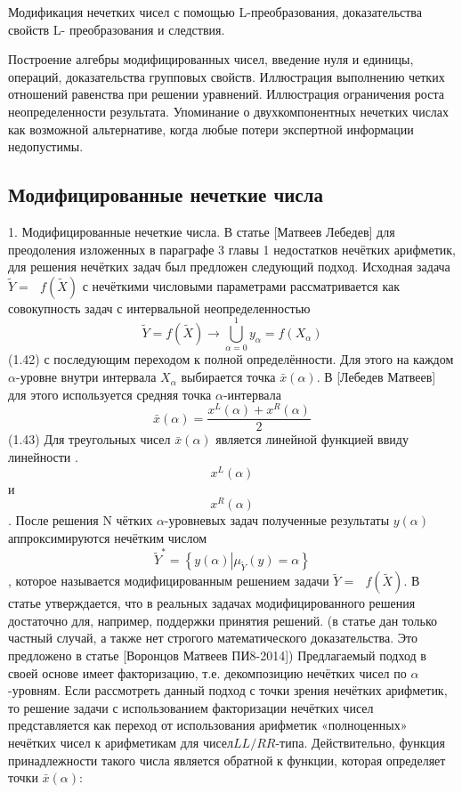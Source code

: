 Модификация нечетких чисел с помощью L-преобразования, доказательства свойств L- преобразования и следствия.

Построение алгебры модифицированных чисел, введение нуля и единицы,  операций, доказательства групповых свойств. Иллюстрация выполнению четких отношений равенства при решении уравнений. Иллюстрация ограничения роста неопределенности результата. Упоминание о двухкомпонентных нечетких числах как возможной альтернативе, когда любые потери экспертной информации недопустимы.

\subsection{Модифицированные нечеткие числа}

1. Модифицированные нечеткие числа.
В статье [Матвеев Лебедев] для преодоления изложенных в параграфе 3 главы 1 недостатков нечётких арифметик, для решения нечётких задач был предложен следующий подход. Исходная задача $\tilde{Y}=\text{ }f\left( {\tilde{X}} \right)$ с нечёткими числовыми параметрами рассматривается как совокупность задач с интервальной неопределенностью
	\[\tilde{Y}=f\left( {\tilde{X}} \right)\to \bigcup\limits_{\alpha =0}^{1}{{{y}_{\alpha }}=f\left( {{X}_{\alpha }} \right)}\] 	(1.42)
с последующим переходом к полной определённости. Для этого на каждом $\alpha $-уровне внутри интервала ${{X}_{\alpha }}$ выбирается точка $\bar{x}\left( \alpha  \right)$. В [Лебедев Матвеев] для этого используется средняя точка $\alpha $-интервала
	\[\bar{x}\left( \alpha  \right)=\frac{{{x}^{L}}\left( \alpha  \right)+{{x}^{R}}\left( \alpha  \right)}{2}\] 	(1.43)
Для треугольных чисел $\bar{x}\left( \alpha  \right)$ является линейной функцией ввиду линейности .\[{{x}^{L}}\left( \alpha  \right)\] и \[{{x}^{R}}\left( \alpha  \right)\]. После решения N чётких $\alpha $-уровневых задач полученные результаты $y\left( \alpha  \right)$ аппроксимируются нечётким числом \[{{\tilde{Y}}^{*}}=\left\{ y(\alpha )\left| {{\mu }_{{\tilde{Y}}}}(y)=\alpha  \right. \right\}\], которое называется модифицированным решением задачи $\tilde{Y}=\text{ }f\left( {\tilde{X}} \right)$. В статье утверждается, что в реальных задачах модифицированного решения достаточно для, например, поддержки принятия решений. (в статье дан только частный случай, а также нет строгого математического доказательства. Это предложено в статье [Воронцов Матвеев ПИ8-2014]) Предлагаемый подход в своей основе имеет факторизацию, т.е. декомпозицию нечётких чисел по $\alpha $-уровням.
Если рассмотреть данный подход с точки зрения нечётких арифметик, то решение задачи с использованием факторизации нечётких чисел представляется как переход от использования арифметик «полноценных» нечётких чисел к арифметикам для чисел$LL/RR$-типа. Действительно, функция принадлежности такого числа является обратной к функции, которая определяет точки $\bar{x}\left( \alpha  \right)$:
